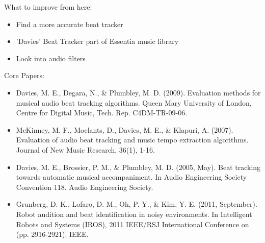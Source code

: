 \documentclass{beamer}
\begin{document}
	\begin{frame}
		What to improve from here:
		\begin{itemize}
			\item Find a more accurate beat tracker
			\item 'Davies' Beat Tracker part of Essentia music library
			\item Look into audio filters
		\end{itemize}
	\end{frame}
	\begin{frame}
		Core Papers:
		\begin{itemize}
			\item Davies, M. E., Degara, N., \& Plumbley, M. D. (2009). Evaluation methods for musical audio beat tracking algorithms. Queen Mary University of London, Centre for Digital Music, Tech. Rep. C4DM-TR-09-06.
			\item McKinney, M. F., Moelants, D., Davies, M. E., \& Klapuri, A. (2007). Evaluation of audio beat tracking and music tempo extraction algorithms. Journal of New Music Research, 36(1), 1-16.
			\item Davies, M. E., Brossier, P. M., \& Plumbley, M. D. (2005, May). Beat tracking towards automatic musical accompaniment. In Audio Engineering Society Convention 118. Audio Engineering Society.
			\item Grunberg, D. K., Lofaro, D. M., Oh, P. Y., \& Kim, Y. E. (2011, September). Robot audition and beat identification in noisy environments. In Intelligent Robots and Systems (IROS), 2011 IEEE/RSJ International Conference on (pp. 2916-2921). IEEE.
		\end{itemize}
	\end{frame}
\end{document}
